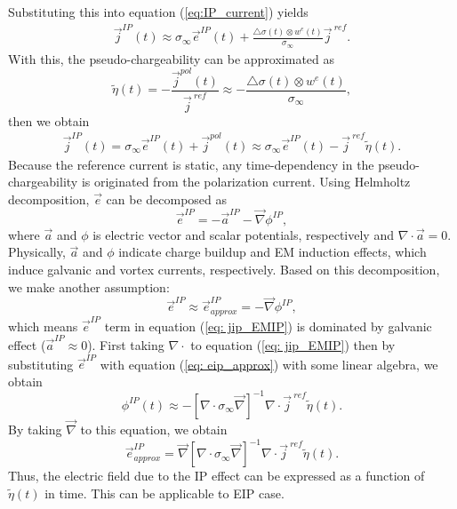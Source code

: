 \documentclass[a4paper, 11pt]{article}
\renewcommand{\div}{\nabla\cdot}
\newcommand{\grad}{\vec \nabla}
\newcommand{\siginf}{\sigma_\infty}
\newcommand{\dsig}{\triangle\sigma}
\renewcommand {\j}  { {\vec j} }
\newcommand {\e}  { {\vec e} }
\newcommand{\peta}{\tilde{\eta}}
\begin{document}
Substituting this into equation (\ref{eq:IP_current}) yields
\begin{eqnarray*}
  \j^{IP}(t) \approx \siginf\e^{IP}(t) + \frac{\dsig(t)\otimes w^e(t)}{\siginf}\j^{\ ref}.
\end{eqnarray*}
With this, the pseudo-chargeability can be approximated as
\begin{equation}
    \peta(t) = -\frac{\j^{pol}(t)}{\j^{\ ref}} \approx -\frac{\dsig(t)\otimes w^e(t)}{\siginf},
    \label{eq: pseudochargeability}
\end{equation}
then we obtain
\begin{eqnarray}
  \j^{IP}(t) = \siginf\e^{IP}(t) + \j^{pol}(t) \approx \siginf\e^{IP}(t) -\j^{\ ref}\peta(t).
  \label{eq: jip_EMIP}
\end{eqnarray}
Because the reference current is static, any time-dependency in the pseudo-chargeability is originated from the polarization current. 
Using Helmholtz decomposition, $\e$ can be decomposed as 
\begin{equation}
  \e^{IP}=-\vec{a}^{IP}-\grad\phi^{IP},
  \label{eq: eip_helmholtz}
\end{equation}
where $\vec{a}$ and $\phi$ is electric vector and scalar potentials, respectively and $\div\vec{a}=0$. 
Physically, $\vec{a}$ and $\phi$ indicate charge buildup and EM induction effects, which induce galvanic and vortex currents, respectively.
Based on this decomposition, we make another assumption:
\begin{equation}
  \e^{IP} \approx  \e^{IP}_{approx} = -\grad\phi^{IP},
  \label{eq: eip_approx}
\end{equation}
which means $\e^{IP}$ term in equation (\ref{eq: jip_EMIP}) is dominated by galvanic effect ($\vec{a}^{IP} \approx 0$). 
First taking $\div$ to equation (\ref{eq: jip_EMIP}) then by substituting  $\e^{IP}$ with equation (\ref{eq: eip_approx}) with some linear algebra, we obtain
\begin{equation}
  \phi^{IP}(t) \approx -[\div \siginf\grad]^{-1}\div\j^{\ ref}\peta(t).
  \label{eq: phiIPapprox_general}
\end{equation}
By taking $\grad$ to this equation, we obtain 
\begin{equation}
    \e^{IP}_{approx} = \grad[\div \siginf\grad]^{-1}\div\j^{\ ref}\peta(t).
    \label{eq: eip_approx_full}
\end{equation}
Thus, the electric field due to the IP effect can be expressed as a function of $\peta(t)$ in time. This can be applicable to EIP case.   
\end{document}
